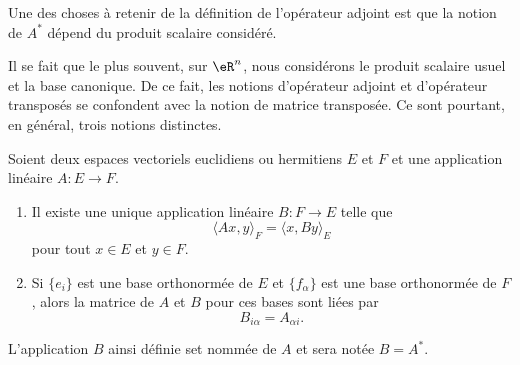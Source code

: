 \begin{normaltext}      \label{NORMooWGEJooCtGtqZ}
	Une des choses à retenir de la définition de l'opérateur adjoint est que la notion de \( A^*\) dépend du produit scalaire considéré.

	Il se fait que le plus souvent, sur \( \eR^n\), nous considérons le produit scalaire usuel et la base canonique. De ce fait, les notions d'opérateur adjoint et d'opérateur transposés se confondent avec la notion de matrice transposée. Ce sont pourtant, en général, trois notions distinctes.
\end{normaltext}

\begin{propositionDef}\label{DEFooROVNooFlTbSK}
	Soient deux espaces vectoriels euclidiens ou hermitiens \( E\) et \( F\) et une application linéaire \( A\colon E\to F\).
	\begin{enumerate}
		\item       \label{ITEMooRUZWooSZgGnf}
		      Il existe une unique application linéaire \( B\colon F\to E\) telle que
		      \begin{equation}        \label{EQooHWYKooFzAGgB}
			      \langle Ax, y\rangle_F=\langle x, By\rangle_E
		      \end{equation}
		      pour tout \( x\in E\) et \( y\in F\).
		\item   \label{ITEMooXXEUooPtfPKY}
		      Si \( \{ e_i \}\) est une base orthonormée de \( E\) et \( \{ f_{\alpha} \}\) est une base orthonormée de \( F\), alors la matrice de \( A\) et \( B\) pour ces bases sont liées par
		      \begin{equation}       \label{EQooUSNVooQtRNGL}
			      B_{i\alpha}=A_{\alpha i}.
		      \end{equation}
	\end{enumerate}
	L'application \( B\) ainsi définie set nommée  de \( A\) et sera notée \( B=A^*\).
\end{propositionDef}

